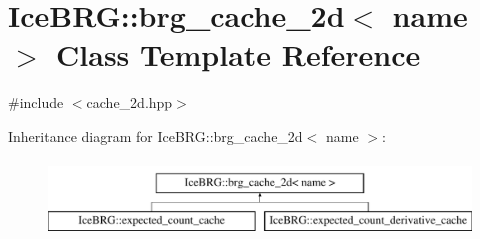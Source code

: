 \hypertarget{classIceBRG_1_1brg__cache__2d}{}\section{Ice\+B\+R\+G\+:\+:brg\+\_\+cache\+\_\+2d$<$ name $>$ Class Template Reference}
\label{classIceBRG_1_1brg__cache__2d}


{\ttfamily \#include $<$cache\+\_\+2d.\+hpp$>$}

Inheritance diagram for Ice\+B\+R\+G\+:\+:brg\+\_\+cache\+\_\+2d$<$ name $>$\+:\begin{figure}[H]
\begin{center}
\leavevmode
\includegraphics[height=2.000000cm]{classIceBRG_1_1brg__cache__2d}
\end{center}
\end{figure}
